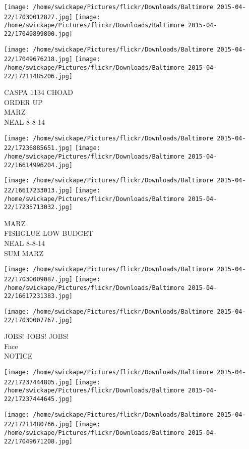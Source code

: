 \documentclass[10pt,letterpaper]{article}
\begin{document}
\texttt{[image: /home/swickape/Pictures/flickr/Downloads/Baltimore 2015-04-22/17030012827.jpg]}
\texttt{[image: /home/swickape/Pictures/flickr/Downloads/Baltimore 2015-04-22/17049899800.jpg]}

\texttt{[image: /home/swickape/Pictures/flickr/Downloads/Baltimore 2015-04-22/17049676218.jpg]}
\texttt{[image: /home/swickape/Pictures/flickr/Downloads/Baltimore 2015-04-22/17211485206.jpg]}

CASPA 1134 CHOAD\\
ORDER UP\\
MARZ\\
NEAL 8{-}8{-}14
\pagebreak

\texttt{[image: /home/swickape/Pictures/flickr/Downloads/Baltimore 2015-04-22/17236885651.jpg]}
\texttt{[image: /home/swickape/Pictures/flickr/Downloads/Baltimore 2015-04-22/16614996204.jpg]}

\texttt{[image: /home/swickape/Pictures/flickr/Downloads/Baltimore 2015-04-22/16617233013.jpg]}
\texttt{[image: /home/swickape/Pictures/flickr/Downloads/Baltimore 2015-04-22/17235713032.jpg]}

MARZ\\
FISHGLUE LOW BUDGET\\
NEAL 8{-}8{-}14\\
SUM MARZ
\pagebreak

\texttt{[image: /home/swickape/Pictures/flickr/Downloads/Baltimore 2015-04-22/17030009087.jpg]}
\texttt{[image: /home/swickape/Pictures/flickr/Downloads/Baltimore 2015-04-22/16617231383.jpg]}

\vspace{0.25in}
\texttt{[image: /home/swickape/Pictures/flickr/Downloads/Baltimore 2015-04-22/17030007767.jpg]}

JOBS!  JOBS!  JOBS!\\
Face\\
NOTICE
\pagebreak

\texttt{[image: /home/swickape/Pictures/flickr/Downloads/Baltimore 2015-04-22/17237444805.jpg]}
\texttt{[image: /home/swickape/Pictures/flickr/Downloads/Baltimore 2015-04-22/17237444645.jpg]}

\texttt{[image: /home/swickape/Pictures/flickr/Downloads/Baltimore 2015-04-22/17211480766.jpg]}
\texttt{[image: /home/swickape/Pictures/flickr/Downloads/Baltimore 2015-04-22/17049671208.jpg]}
\end{document}
